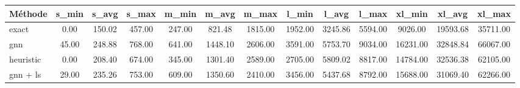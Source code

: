 \begin{tabular}{lcccccccccccc}
\toprule
Méthode & s_min & s_avg & s_max & m_min & m_avg & m_max & l_min & l_avg & l_max & xl_min & xl_avg & xl_max \\
\midrule
exact & 0.00 & 150.02 & 457.00 & 247.00 & 821.48 & 1815.00 & 1952.00 & 3245.86 & 5594.00 & 9026.00 & 19593.68 & 35711.00 \\
gnn & 45.00 & 248.88 & 768.00 & 641.00 & 1448.10 & 2606.00 & 3591.00 & 5753.70 & 9034.00 & 16231.00 & 32848.84 & 66067.00 \\
heuristic & 0.00 & 208.40 & 674.00 & 345.00 & 1301.40 & 2589.00 & 2705.00 & 5809.02 & 8817.00 & 14784.00 & 32536.38 & 62105.00 \\
gnn + ls & 29.00 & 235.26 & 753.00 & 609.00 & 1350.60 & 2410.00 & 3456.00 & 5437.68 & 8792.00 & 15688.00 & 31069.40 & 62266.00 \\
\bottomrule
\end{tabular}
